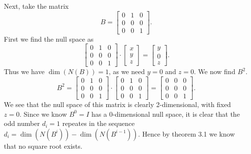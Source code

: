 \documentclass{article}
\begin{document}
\begin{solution}
  Next, take the matrix
  \[B = \begin{bmatrix} 0 & 1 & 0\\ 0 & 0 & 0\\ 0 & 0 & 1 \end{bmatrix}.\]
  First we find the null space as
  \[\begin{bmatrix} 0 & 1 & 0\\ 0 & 0 & 0\\ 0 & 0 & 1 \end{bmatrix} \cdot \begin{bmatrix} x\\ y\\ z \end{bmatrix} = \begin{bmatrix} y\\ 0\\ z \end{bmatrix}.\]
  Thus we have $\dim(N(B)) = 1$, as we need $y = 0$ and $z = 0$.
  We now find $B^2$.
  \[B^2 = \begin{bmatrix} 0 & 1 & 0\\ 0 & 0 & 0\\ 0 & 0 & 1 \end{bmatrix} \cdot \begin{bmatrix} 0 & 1 & 0\\ 0 & 0 & 0\\ 0 & 0 & 1 \end{bmatrix} = \begin{bmatrix} 0 & 0 & 0\\ 0 & 0 & 0\\ 0 & 0 & 1 \end{bmatrix}.\]
  We see that the null space of this matrix is clearly 2-dimensional, with fixed $z = 0$.
  Since we know $B^0 = I$ has a 0-dimensional null space, it is clear that the odd number $d_i = 1$ repeates in the sequence $d_i = \dim(N(B^i)) - \dim(N(B^{i - 1}))$.
  Hence by theorem 3.1 we know that no square root exists.


\end{solution}
\end{document}
